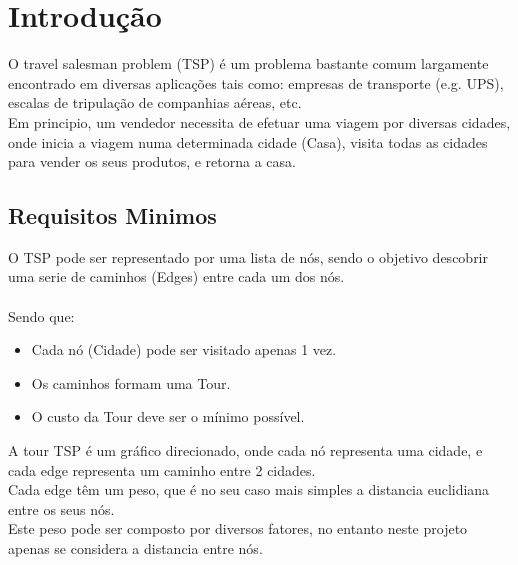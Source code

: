 \documentclass[12pt,a4paper,portrait]{article}
\begin{document}
	
	\tableofcontents
	
	
	\newpage
	\section{Introdução}
		O travel salesman problem (TSP) é um problema bastante comum largamente encontrado em diversas aplicações tais como: empresas de transporte (e.g. UPS), escalas de tripulação de companhias aéreas, etc.\\
		Em principio, um vendedor necessita de efetuar uma viagem por diversas cidades, onde inicia a viagem numa determinada cidade (Casa), visita todas as cidades para vender os seus produtos, e retorna a casa.\\
		\subsection{Requisitos Minimos}	
			O TSP pode ser representado por uma lista de nós, sendo o objetivo descobrir uma serie de caminhos (Edges) entre cada um dos nós.\\\\
			Sendo que:\\
			\begin{itemize}
				\item Cada nó (Cidade) pode ser visitado apenas 1 vez.
				\item Os caminhos formam uma Tour.
				\item O custo da Tour deve ser o mínimo possível.
			\end{itemize}
			A tour TSP é um gráfico direcionado, onde cada nó representa uma cidade, e cada edge representa um caminho entre 2 cidades.\\
			Cada edge têm um peso, que é no seu caso mais simples a distancia euclidiana entre os seus nós.\\
			Este peso pode ser composto por diversos fatores, no entanto neste projeto apenas se considera a distancia entre nós.\\ 			
			\newpage
\end{document}
